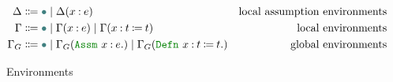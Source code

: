 \begin{figure}
\centering
\begin{align*}
\Delta &\Coloneqq \mt \mid \Delta(\assm{x}{e}) &\text{local assumption environments} \\
\Gamma &\Coloneqq \mt \mid \Gamma(\assm{x}{e}) \mid \Gamma(\defn{x}{t}{t}) &\text{local environments} \\
\Gamma_G &\Coloneqq \mt \mid \Gamma_G(\Assm{x}{e}) \mid \Gamma_G(\Defn{x}{t}{t}) &\text{global environments}
\end{align*}
\caption{Environments}
\label{fig:contexts}
\end{figure}

